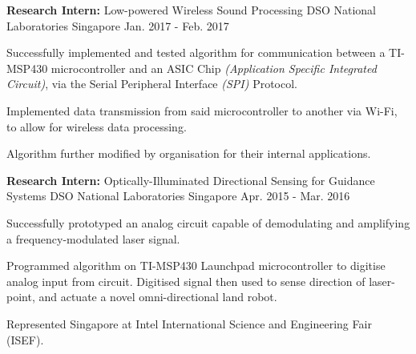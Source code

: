 \begin{cventries}

\label{wirelessSoundProcessing}

\cventry
{\textbf{Research Intern:} Low-powered Wireless Sound Processing
} %
{DSO National Laboratories} %
{Singapore} %
{Jan. 2017 - Feb. 2017} %
{ %
\begin{cvitems}
	\item { Successfully implemented and tested algorithm for communication between a TI-MSP430 microcontroller and an ASIC Chip \textit{(Application Specific Integrated Circuit)}, via the Serial Peripheral Interface \textit{(SPI)} Protocol. }
	\item { Implemented data transmission from said microcontroller to another via Wi-Fi, to allow for wireless data processing. }
	\item { Algorithm further modified by organisation for their internal applications. }
\end{cvitems}
}


\label{lightDirectionFinderProject}

\cventry
{\textbf{Research Intern:} Optically-Illuminated Directional Sensing for Guidance Systems 
} %
{DSO National Laboratories} %
{Singapore} %
{Apr. 2015 - Mar. 2016} %
{ %
\begin{cvitems}
	\item { Successfully prototyped an analog circuit capable of demodulating and amplifying a frequency-modulated laser signal. }
	\item { Programmed algorithm on TI-MSP430 Launchpad microcontroller to digitise analog input from circuit. \newline Digitised signal then used to sense direction of laser-point, and actuate a novel omni-directional land robot.}
	\item { Represented Singapore at Intel International Science and Engineering Fair (ISEF). }
\end{cvitems}
}


\label{eyeTrackingProject}


\end{cventries}
